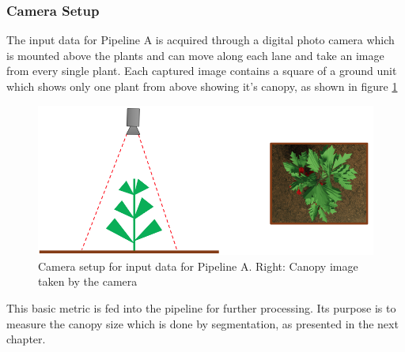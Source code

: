 \graphicspath{{members/ssr/figures/}}

\subsubsection{Camera Setup}


The input data for Pipeline A is acquired through a digital photo camera which is mounted above the
plants and can move along each lane and take an image from every single plant.
Each captured image contains a square of a ground unit which shows only one plant from above
showing it's canopy, as shown in figure \ref{fig:pipeline:a:camera:setup}

\begin{figure}[H]
    \includegraphics[width=\textwidth,height=\textheight,keepaspectratio]{modelling/camera-setup.png}
    \caption{Camera setup for input data for Pipeline A. Right: Canopy image taken by the camera}
    \label{fig:pipeline:a:camera:setup}
\end{figure}

This basic metric is fed into the pipeline for further processing.
Its purpose is to measure the canopy size which is done by segmentation, as presented in the next chapter.